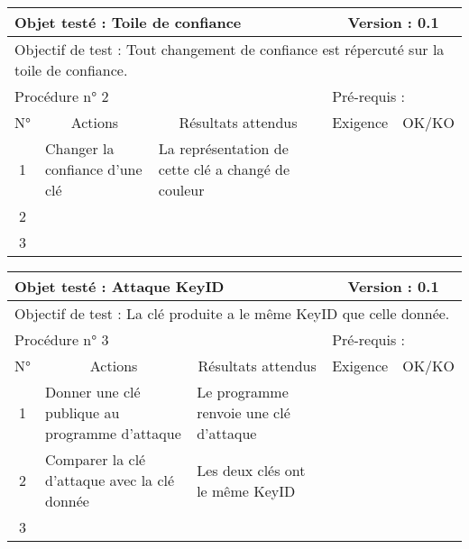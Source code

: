 \documentclass{../res/univ-projet}
\begin{document}
\begin{center}
    \begin{tabular}{|c|p{5cm}|p{5cm}|p{1.5cm}|p{1.5cm}|}
      \hline
      \multicolumn{3}{|l|}{Objet testé : Toile de confiance} & \multicolumn{2}{c|}{Version : 0.1}\\ \hline
      \multicolumn{5}{|l|}{Objectif de test : Tout changement de confiance est répercuté sur la toile de confiance.}\\ \hline
      \multicolumn{3}{|l|}{Procédure n° 2} & \multicolumn{2}{p{3cm}|}{Pré-requis : }\\ \hline
      \multicolumn{1}{|c|}{N°} & \multicolumn{1}{c|}{Actions} & \multicolumn{1}{c|}{Résultats attendus} & 
      \multicolumn{1}{c|}{Exigence} & \multicolumn{1}{c|}{OK/KO}\\ \hline
      1 & Changer la confiance d'une clé & La représentation de cette clé a changé de couleur &  & \\
      2 &  &  &  & \\
      3 &  &  &  & \\ \hline
    \end{tabular}
    \vskip 2.2cm



    \begin{tabular}{|c|p{5cm}|p{5cm}|p{1.5cm}|p{1.5cm}|}
      \hline
      \multicolumn{3}{|l|}{Objet testé : Attaque KeyID} & \multicolumn{2}{c|}{Version : 0.1}\\ \hline
      \multicolumn{5}{|l|}{Objectif de test : La clé produite a le même KeyID que celle donnée.}\\ \hline
      \multicolumn{3}{|l|}{Procédure n° 3} & \multicolumn{2}{p{3cm}|}{Pré-requis : }\\ \hline
      \multicolumn{1}{|c|}{N°} & \multicolumn{1}{c|}{Actions} & \multicolumn{1}{c|}{Résultats attendus} & 
      \multicolumn{1}{c|}{Exigence} & \multicolumn{1}{c|}{OK/KO}\\ \hline
      1 & Donner une clé publique au programme d'attaque & Le programme renvoie une clé d'attaque &  & \\
      2 & Comparer la clé d'attaque avec la clé donnée & Les deux clés ont le même KeyID &  & \\
      3 &  &  &  & \\ \hline
    \end{tabular}
    \vskip 2.2cm




\end{center}
\end{document}
